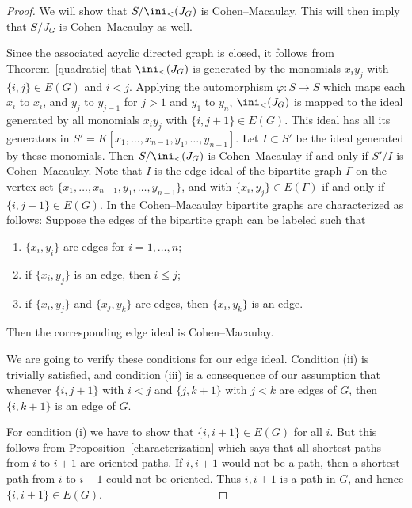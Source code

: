 \documentclass[11pt]{amsart}
\let\to=\rightarrow
\let\:=\colon
\begin{document}
\begin{proof}
We will show that $S/\ini_<(J_G)$ is Cohen--Macaulay. This will then imply that $S/J_G$ is Cohen--Macaulay as well.

Since the associated acyclic directed graph is closed, it follows from Theorem~\ref{quadratic} that $\ini_<(J_G)$ is generated by the monomials $x_iy_j$ with $\{i,j\}\in E(G)$ and $i<j$. Applying the automorphism $\varphi \: S\to S$ which maps each $x_i$ to $x_i$,  and $y_j$ to $y_{j-1}$ for $j>1$ and $y_1$ to $y_n$,  $\ini_<(J_G)$ is mapped to the ideal  generated by all monomials $x_iy_j$ with $\{i,j+1\}\in E(G)$. This ideal  has all its generators in $S'=K[x_1,\ldots,x_{n-1},y_1,\ldots,y_{n-1}]$. Let $I\subset S'$ be the ideal generated by these monomials. Then $S/\ini_<(J_G)$ is Cohen--Macaulay if and only if $S'/I$ is Cohen--Macaulay. Note that $I$ is the edge ideal of the bipartite graph $\Gamma$ on the vertex set $\{x_1,\ldots,x_{n-1},y_1,\ldots,y_{n-1}\}$, and  with $\{x_i,y_j\}\in E(\Gamma)$ if and only if $\{i,j+1\}\in E(G)$. In \cite{HH} the Cohen--Macaulay bipartite graphs are characterized as follows: Suppose the edges of the bipartite graph can be labeled such that
\begin{enumerate}
\item[(i)] $\{x_i,y_i\}$ are edges for $i=1,\ldots,n$;

\item[(ii)] if $\{x_i,y_j\}$ is an edge, then $i\leq j$;

\item[(iii)] if $\{x_i,y_j\}$ and $\{x_j,y_k\}$ are edges, then
$\{x_i,y_k\}$ is an edge.
\end{enumerate}
Then the corresponding edge ideal is Cohen--Macaulay.

We are going to verify these conditions for our edge ideal. Condition (ii) is trivially satisfied, and condition (iii) is a consequence of our assumption that  whenever  $\{i,j+1\}$ with $i<j$ and $\{j,k+1\}$ with $j<k$ are edges of $G$,  then $\{i,k+1\}$ is an edge of $G$.

For condition (i) we have to show that $\{i,i+1\}\in E(G)$ for all $i$. But this follows from Proposition~\ref{characterization} which says that all shortest paths from $i$ to $i+1$ are oriented paths. If $i,i+1$ would not be a path, then a shortest path from $i$ to $i+1$ could not be oriented. Thus $i,i+1$ is a path in $G$, and hence $\{i,i+1\}\in E(G)$.
\, \, \, \, \, \, \, \, \, \,
\, \, \, \, \, \, \, \, \, \,
\end{proof}
\end{document}
